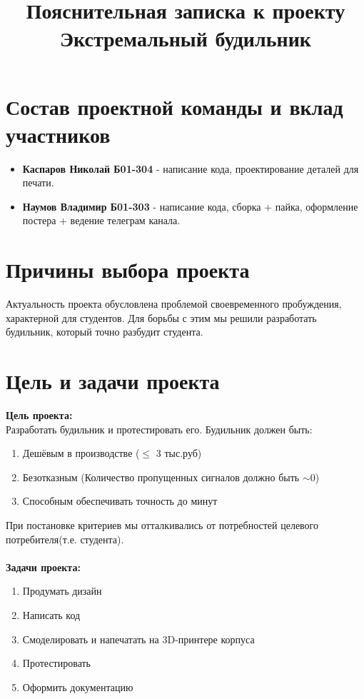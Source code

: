 \documentclass[12pt,a4paper]{article}
\title{Пояснительная записка к проекту \\
        \textbf{Экстремальный будильник}}
\date{}
\begin{document}
\maketitle

\section{Состав проектной команды и вклад участников}

\begin{itemize}
    \item \textbf{Каспаров Николай Б01-304} - написание кода, проектирование деталей для печати.
    \item \textbf{Наумов Владимир Б01-303} - написание кода, сборка + пайка, оформление постера + ведение телеграм канала.
\end{itemize}

\section{Причины выбора проекта}

Актуальность проекта обусловлена проблемой своевременного пробуждения, характерной для студентов. Для борьбы с этим мы решили разработать будильник, который точно разбудит студента.

\section{Цель и задачи проекта}

\textbf{Цель проекта:} \\
Разработать будильник и протестировать его.
Будильник должен быть:
\begin{enumerate}
    \item Дешёвым в производстве ($\leqslant$ 3 тыс.руб)
    \item Безотказным (Количество пропущенных сигналов должно быть $\sim$0)
    \item Способным обеспечивать точность до минут
\end{enumerate}
При постановке критериев мы отталкивались от потребностей целевого потребителя(т.е. студента).
\\ \\
\textbf{Задачи проекта:}

\begin{enumerate}
    \item Продумать дизайн
    \item Написать код
    \item Смоделировать и напечатать на 3D-принтере корпуса
    \item Протестировать
    \item Оформить документацию
\end{enumerate}
\end{document}
